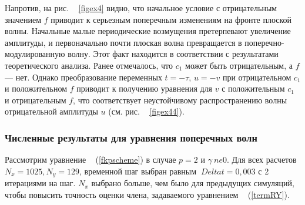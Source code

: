 Напротив, на рис. ~ \ref{figex4} видно, что начальное условие с отрицательным значением $ f $ приводит к серьезным поперечным изменениям на фронте плоской волны. Начальные малые периодические возмущения претерпевают увеличение амплитуды, и первоначально почти плоская волна превращается в поперечно-модулированную волну. Этот факт находится в соответствии с результатами теоретического анализа. Ранее отмечалось, что $ c_1 $ может быть отрицательным, а $ f $ --- нет. Однако преобразование переменных $ t = - \tau $, $ u = -v $ при отрицательном $ c_1 $ и положительном $ f $ приводит к получению уравнения для $ v $ с положительным $ c_1 $ и отрицательным $ f $, что соответствует неустойчивому распространению волны отрицательной амплитуды $ u $ (см. рис. ~ \ref{figex44}).

\subsubsection{Численные результаты для уравнения поперечных волн}

Рассмотрим уравнение ~ (\ref{fkpscheme}) в случае $ p = 2 $ и $ \gamma \ ne 0 $.
Для всех расчетов $ N_x = 1025, N_y = 129 $, временной шаг выбран равным $ \ Delta t = 0,003 $ с 2 итерациями на шаг. $ N_x $ выбрано больше, чем было для предыдущих симуляций, чтобы повысить точность оценки члена, задаваемого уравнением ~ (\ref{termRY}).

